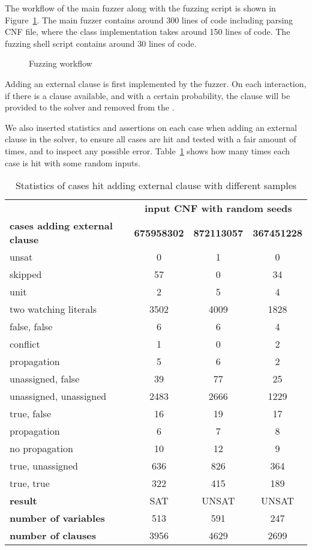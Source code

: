 The workflow of the main fuzzer along with the fuzzing script is shown in Figure~\ref{fig:fuzzer}. The main fuzzer contains around 300 lines of  code including parsing CNF file, where the  class implementation takes around 150 lines of code. The fuzzing shell script contains around 30 lines of code.

\begin{figure}[!htbp]
  \centering
  
  \caption{Fuzzing workflow}
  \label{fig:fuzzer}
\end{figure}

Adding an external clause is first implemented by the fuzzer. On each interaction, if there is a clause available, and with a certain probability, the clause will be provided to the solver and removed from the .

We also inserted statistics and assertions on each case when adding an external clause in the solver, to ensure all cases are hit and tested with a fair amount of times, and to inspect any possible error. Table~\ref{tab:stats} shows how many times each case is hit with some random inputs.

\begin{table}[!htbp]
  \centering
  \begin{tabular}{|l|c|c|c|}
    \hline
    & \multicolumn{3}{c|}{\textbf{input CNF with random seeds}} \\
    \cline{2-4}
    \textbf{cases adding external clause} & \textbf{675958302} & \textbf{872113057} & \textbf{367451228} \\
    \hline
    unsat & 0 & 1 & 0 \\
    skipped & 57 & 0 & 34 \\
    unit & 2 & 5 & 4 \\
    two watching literals & 3502 & 4009 & 1828 \\
    \quad false, false & 6 & 6 & 4 \\
    \quad\quad conflict & 1 & 0 & 2 \\
    \quad\quad propagation & 5 & 6 & 2 \\
    \quad unassigned, false & 39 & 77 & 25 \\
    \quad unassigned, unassigned & 2483 & 2666 & 1229 \\
    \quad true, false & 16 & 19 & 17 \\
    \quad\quad propagation & 6 & 7 & 8 \\
    \quad\quad no propagation & 10 & 12 & 9 \\
    \quad true, unassigned & 636 & 826 & 364 \\
    \quad true, true & 322 & 415 & 189 \\
    \hline
    \textbf{result} & SAT & UNSAT & UNSAT \\
    \textbf{number of variables} & 513 & 591 & 247 \\
    \textbf{number of clauses} & 3956 & 4629 & 2699 \\
    \hline
  \end{tabular}
  \caption{Statistics of cases hit adding external clause with different samples}
  \label{tab:stats}
\end{table}

